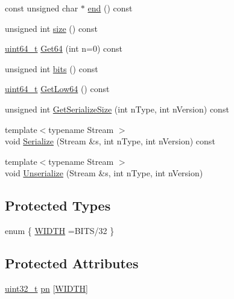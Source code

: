 \begin{DoxyCompactItemize}
const unsigned char $\ast$ \hyperlink{classbase__uint_a4e073e41505b8fb901881342a7ea397a}{end} () const 
\item 
unsigned int \hyperlink{classbase__uint_ae0e221686cd63384569a8db5cc06d4c9}{size} () const 
\item 
\hyperlink{stdint_8h_aaa5d1cd013383c889537491c3cfd9aad}{uint64\+\_\+t} \hyperlink{classbase__uint_a0cb831d93f1580c1355b9665c21629f2}{Get64} (int n=0) const 
\item 
unsigned int \hyperlink{classbase__uint_a4867652ab4163a10ac4e3d04f0352423}{bits} () const 
\item 
\hyperlink{stdint_8h_aaa5d1cd013383c889537491c3cfd9aad}{uint64\+\_\+t} \hyperlink{classbase__uint_abf39b71afc016b333b8996def4c6bc40}{Get\+Low64} () const 
\item 
unsigned int \hyperlink{classbase__uint_a16f0848f568f519885b799f0eb388dcd}{Get\+Serialize\+Size} (int n\+Type, int n\+Version) const 
\item 
{\footnotesize template$<$typename Stream $>$ }\\void \hyperlink{classbase__uint_a0c2c978306503bb188caabc873ed0b2f}{Serialize} (Stream \&s, int n\+Type, int n\+Version) const 
\item 
{\footnotesize template$<$typename Stream $>$ }\\void \hyperlink{classbase__uint_adf1ad639d94997a9cda95e0c424ab51a}{Unserialize} (Stream \&s, int n\+Type, int n\+Version)
\end{DoxyCompactItemize}
\subsection*{Protected Types}
\begin{DoxyCompactItemize}
\item 
enum \{ \hyperlink{classbase__uint_ac5863fc3d36ac3e887fbca5e08efe046adf579395d753e2d9607ecd61424f0853}{W\+I\+D\+T\+H} =B\+I\+T\+S/32
 \}
\end{DoxyCompactItemize}
\subsection*{Protected Attributes}
\begin{DoxyCompactItemize}
\item 
\hyperlink{stdint_8h_a435d1572bf3f880d55459d9805097f62}{uint32\+\_\+t} \hyperlink{classbase__uint_a0edb1465d540fadd92b21659f27083a2}{pn} \mbox{[}\hyperlink{classbase__uint_ac5863fc3d36ac3e887fbca5e08efe046adf579395d753e2d9607ecd61424f0853}{W\+I\+D\+T\+H}\mbox{]}
\end{DoxyCompactItemize}
